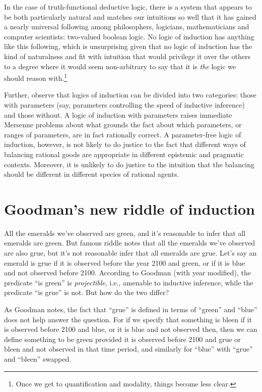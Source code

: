In the case of truth-functional deductive logic, there is a system that appears to be both particularly natural and matches
our intuitions so well that it has gained a nearly universal following among philosophers, logicians, mathematicians
and computer scientists: two-valued boolean logic. No logic of induction has anything
like this following, which is unsurprising given that no logic of induction has the kind
of naturalness and fit with intuition that would privilege it over the others to a degree where it would seem
non-arbitrary to say that it is \textit{the} logic we should reason with.\footnote{Once we get to quantification
and modality, things become less clear.}

Further, observe that logics of induction can be divided into two categories: those with parameters (say, 
parameters controlling the speed of inductive inference) and those without. 
A logic of induction with parameters raises immediate Mersenne problems about what grounds the fact about which 
parameters, or ranges of parameters, are in fact rationally correct. 
A parameter-free logic of induction, however, is not likely to do justice to the fact that different ways of balancing
rational goods are appropriate in different epistemic and pragmatic contexts. Moreover, it is unlikely to do justice
to the intuition that the balancing should be different in different species of rational agents.

\section{Goodman's new riddle of induction}
All the emeralds we've observed are green, and it's reasonable to infer that all emeralds are green.
But  famous riddle notes that all the emeralds we've observed are also grue, but it's not reasonable infer 
that all emeralds are grue. Let's say an emerald is grue if it is observed before the year 2100 and green, or if it is 
blue and not observed before 2100. According to Goodman (with year modified), the predicate ``is green'' is \textit{projectible}, i.e., amenable to 
inductive inference, while the predicate ``is grue'' is not. But how do the two differ?

As Goodman notes, the fact that ``grue'' is defined in terms of ``green'' and ``blue'' does not help answer the
question. For if we specify that something is bleen if it is observed before 2100 and blue, or it is blue and not observed
then, then we can define something to be green provided it is observed before 2100 and grue or bleen and not observed in that time period, and similarly for ``blue'' with ``grue'' and ``bleen'' swapped. 

